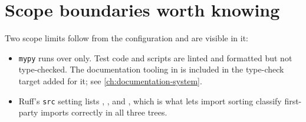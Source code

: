 \section{Scope boundaries worth knowing}

Two scope limits follow from the configuration and are visible in it:

\begin{itemize}
  \item \texttt{mypy} runs over  only. Test code and scripts are
    linted and formatted but not type-checked. The documentation tooling in
     is included in the type-check target added for it;
    see \cref{ch:documentation-system}.
  \item Ruff's \texttt{src} setting lists , , and
    , which is what lets import sorting classify first-party
    imports correctly in all three trees.
\end{itemize}
